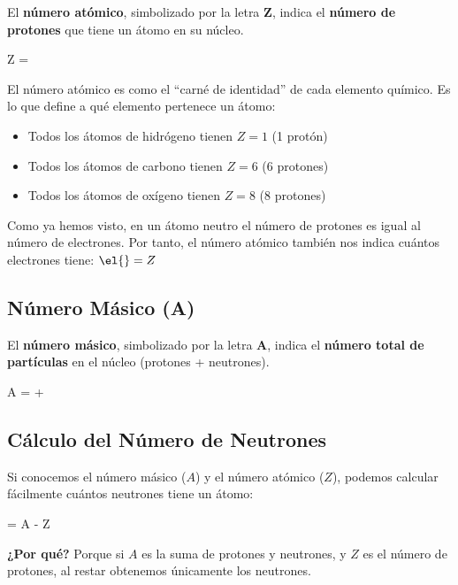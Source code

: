 El \textbf{número atómico}, simbolizado por la letra \( \bm{Z} \), indica el \textbf{número de protones} que tiene un átomo en su núcleo.
\begin{centeredequation}
    Z = 
\end{centeredequation}
El número atómico es como el ``carné de identidad'' de cada elemento químico. Es lo que define a qué elemento pertenece un átomo:
\begin{itemize}
    \item Todos los átomos de hidrógeno tienen \( Z = 1 \) (1 protón)
    \item Todos los átomos de carbono tienen \( Z = 6 \) (6 protones)
    \item Todos los átomos de oxígeno tienen \( Z = 8 \) (8 protones)
\end{itemize}
\begin{remark}
    Como ya hemos visto, en un átomo neutro el número de protones es igual al número de electrones. Por tanto, el número atómico también nos indica cuántos electrones tiene: \( \el{} = Z \)
\end{remark}
\subsection{Número Másico (A)}
El \textbf{número másico}, simbolizado por la letra \( \bm{A} \), indica el \textbf{número total de partículas} en el núcleo (protones + neutrones).
\begin{centeredequation}
    A =  + 
\end{centeredequation}

\subsection{Cálculo del Número de Neutrones}

Si conocemos el número másico (\( A \)) y el número atómico (\( Z \)), podemos calcular fácilmente cuántos neutrones tiene un átomo:
\begin{centeredequation}
     = A - Z
\end{centeredequation}
\begin{remark}
    \textbf{¿Por qué?} Porque si \( A \) es la suma de protones y neutrones, y \( Z \) es el número de protones, al restar obtenemos únicamente los neutrones.
\end{remark}
